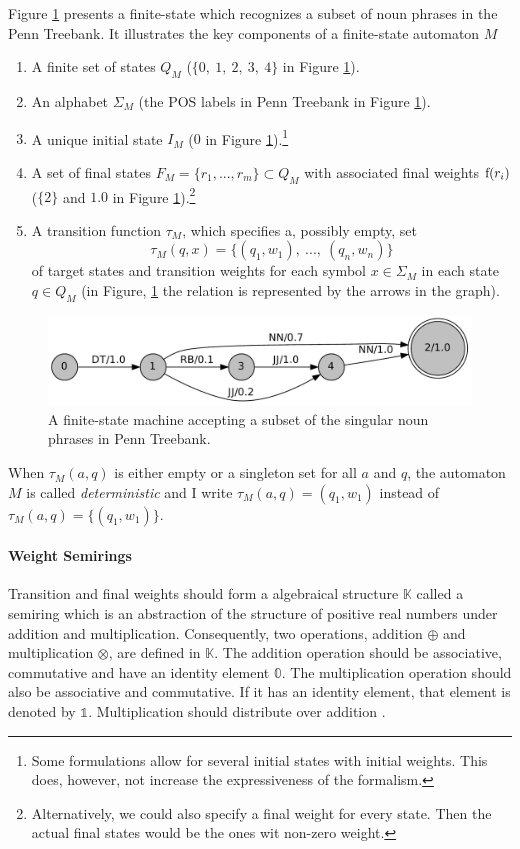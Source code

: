 Figure \ref{fig:np-fsm} presents a finite-state which recognizes a
subset of noun phrases in the Penn Treebank. It illustrates the key
components of a finite-state automaton $M$
\begin{enumerate}
\item A finite set of states $Q_M$ ($\{0,\ 1,\ 2,\ 3,\ 4\}$ in Figure \ref{fig:np-fsm}).
\item An alphabet $\Sigma_M$ (the POS labels in Penn Treebank in Figure \ref{fig:np-fsm}).
\item A unique initial state $I_M$ ($0$ in Figure \ref{fig:np-fsm}).\footnote{Some formulations allow for several initial states with initial weights. This does, however, not increase the expressiveness of the formalism.}
\item A set of final states $F_M = \{r_1, ..., r_m\} \subset Q_M$ with associated final weights ${\rm f}(r_i)$ ($\{2\}$ and $1.0$ in Figure \ref{fig:np-fsm}).\footnote{Alternatively, we could also specify a final weight for every state. Then the actual final states would be the ones wit non-zero weight.}
\item A transition function $\tau_M$, which specifies a, possibly empty, set 
$$\tau_M(q,x) = \{(q_1,w_1),\ ...,\ (q_n,w_n)\}$$ of target states and transition weights for each symbol $x\in \Sigma_M$ in each state $q \in Q_M$ (in Figure, \ref{fig:np-fsm} the relation is represented by the arrows in the graph).
\end{enumerate}
\begin{figure}[!ftb]
\begin{center}
\includegraphics[scale=.65]{np}
\end{center}
\caption{A finite-state machine accepting a subset of the singular noun phrases in Penn Treebank.}\label{fig:np-fsm}
\end{figure}
When $\tau_M(a,q)$ is either empty or a singleton set for all $a$ and $q$, the automaton $M$ is called {\it deterministic} and I write $\tau_M(a,q) = (q_1,w_1)$ instead of $\tau_M(a,q) = \{(q_1,w_1)\}$.

\paragraph{Weight Semirings} Transition and final weights should form a
algebraical structure $\mathbb{K}$ called a semiring which is an abstraction of the
structure of positive real numbers under addition and multiplication. Consequently, two operations, addition $\oplus$ and
multiplication $\otimes$, are defined in $\mathbb{K}$. The addition operation should be
associative, commutative and have an identity element
$\mathbb{0}$. The multiplication operation should also be associative
and commutative. If it has an identity element, that element is
denoted by $\mathbb{1}$. Multiplication should distribute over
addition \citep{Allauzen2007}.

